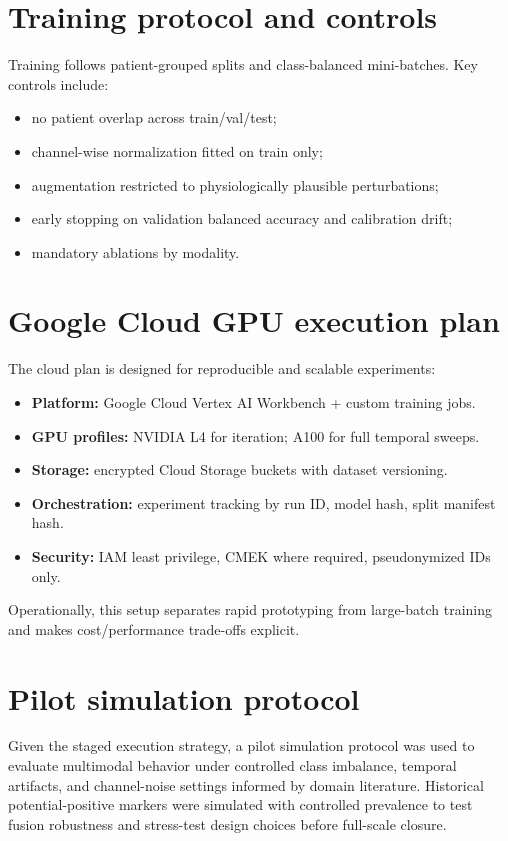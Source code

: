 \documentclass[10pt,a4paper,twocolumn]{article}
\begin{document}
\section{Training protocol and controls}
Training follows patient-grouped splits and class-balanced mini-batches. Key controls include:
\begin{itemize}[leftmargin=1.2cm]
    \item no patient overlap across train/val/test;
    \item channel-wise normalization fitted on train only;
    \item augmentation restricted to physiologically plausible perturbations;
    \item early stopping on validation balanced accuracy and calibration drift;
    \item mandatory ablations by modality.
\end{itemize}

\section{Google Cloud GPU execution plan}
The cloud plan is designed for reproducible and scalable experiments:
\begin{itemize}[leftmargin=1.2cm]
    \item \textbf{Platform:} Google Cloud Vertex AI Workbench + custom training jobs.
    \item \textbf{GPU profiles:} NVIDIA L4 for iteration; A100 for full temporal sweeps.
    \item \textbf{Storage:} encrypted Cloud Storage buckets with dataset versioning.
    \item \textbf{Orchestration:} experiment tracking by run ID, model hash, split manifest hash.
    \item \textbf{Security:} IAM least privilege, CMEK where required, pseudonymized IDs only.
\end{itemize}

Operationally, this setup separates rapid prototyping from large-batch training and makes cost/performance trade-offs explicit.

\section{Pilot simulation protocol}
Given the staged execution strategy, a pilot simulation protocol was used to evaluate multimodal behavior under controlled class imbalance, temporal artifacts, and channel-noise settings informed by domain literature. Historical potential-positive markers were simulated with controlled prevalence to test fusion robustness and stress-test design choices before full-scale closure.
\end{document}
